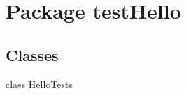 \hypertarget{namespacetestHello}{}\section{Package test\+Hello}
\label{namespacetestHello}
\subsection*{Classes}
\begin{DoxyCompactItemize}
\item 
class \hyperlink{classtestHello_1_1HelloTests}{Hello\+Tests}
\end{DoxyCompactItemize}
